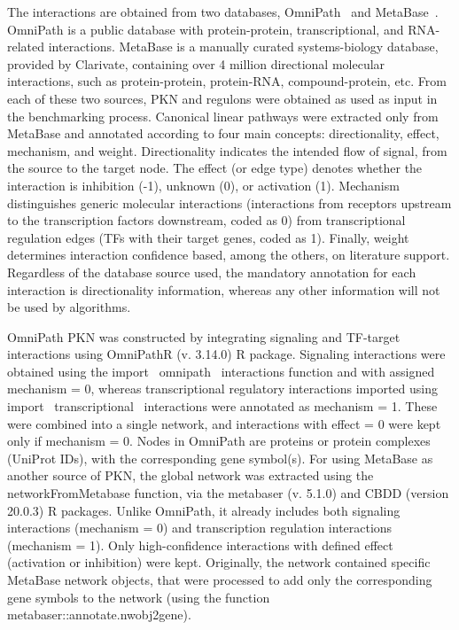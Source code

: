 The interactions are obtained from two databases, OmniPath~\cite{RN91} and MetaBase~\cite{RN33}. 
OmniPath is a public database with protein-protein, transcriptional, and \gls{RNA}-related interactions. MetaBase is a manually curated systems-biology database, provided by Clarivate, containing over 4 million directional molecular interactions, such as protein-protein, protein-\gls{RNA}, compound-protein, etc. 
From each of these two sources, \gls{PKN} and regulons were obtained as used as input in the benchmarking process. Canonical linear pathways were extracted only from MetaBase and annotated according to four main concepts: directionality, effect, mechanism, and weight. 
Directionality indicates the intended flow of signal, from the source to the target node. 
The effect (or edge type) denotes whether the interaction is inhibition (-1), unknown (0), or activation (1). 
Mechanism distinguishes generic molecular interactions (interactions from receptors upstream to the transcription factors downstream, coded as 0) from transcriptional regulation edges (\gls{TF}s with their target genes, coded as 1). 
Finally, weight determines interaction confidence based, among the others, on literature support. Regardless of the database source used, the mandatory annotation for each interaction is directionality information, whereas any other information will not be used by algorithms. 

OmniPath \gls{PKN} was constructed by integrating signaling and \gls{TF}-target interactions using OmniPathR (v. 3.14.0) \gls{R} package. 
Signaling interactions were obtained using the import \ omnipath \ interactions function and with assigned mechanism = 0, whereas transcriptional regulatory interactions imported using import \ transcriptional \ interactions were annotated as mechanism = 1. 
These were combined into a single network, and interactions with effect = 0 were kept only if mechanism = 0. Nodes in OmniPath are proteins or protein complexes (UniProt IDs), with the corresponding gene symbol(s). 
For using MetaBase as another source of \gls{PKN}, the global network was extracted using the networkFromMetabase function, via the metabaser (v. 5.1.0) and \gls{CBDD} (version 20.0.3) \gls{R} packages. 
Unlike OmniPath, it already includes both signaling interactions (mechanism = 0) and transcription regulation interactions (mechanism = 1). 
Only high-confidence interactions with defined effect (activation or inhibition) were kept. 
Originally, the network contained specific MetaBase network objects, that were processed to add only the corresponding gene symbols to the network (using the function metabaser::annotate.nwobj2gene).

